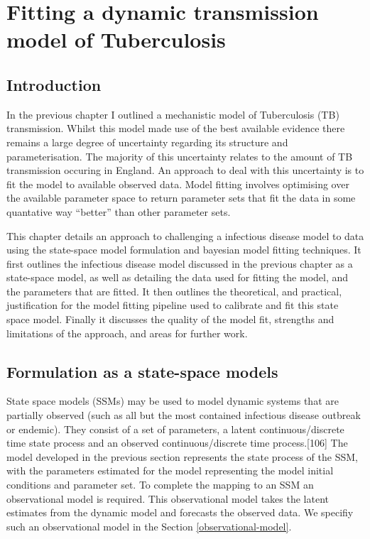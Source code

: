 \documentclass[11pt,twoside]{bristolthesis}
\begin{document}
  \hypertarget{model-fitting}{%
  \chapter{Fitting a dynamic transmission model of Tuberculosis}\label{model-fitting}}
  
  \hypertarget{introduction-7}{%
  \section{Introduction}\label{introduction-7}}
  
  In the previous chapter I outlined a mechanistic model of Tuberculosis (TB) transmission. Whilst this model made use of the best available evidence there remains a large degree of uncertainty regarding its structure and parameterisation. The majority of this uncertainty relates to the amount of TB transmission occuring in England. An approach to deal with this uncertainty is to fit the model to available observed data. Model fitting involves optimising over the available parameter space to return parameter sets that fit the data in some quantative way ``better'' than other parameter sets.
  
  This chapter details an approach to challenging a infectious disease model to data using the state-space model formulation and bayesian model fitting techniques. It first outlines the infectious disease model discussed in the previous chapter as a state-space model, as well as detailing the data used for fitting the model, and the parameters that are fitted. It then outlines the theoretical, and practical, justification for the model fitting pipeline used to calibrate and fit this state space model. Finally it discusses the quality of the model fit, strengths and limitations of the approach, and areas for further work.
  
  \hypertarget{formulation-as-a-state-space-models}{%
  \section{Formulation as a state-space models}\label{formulation-as-a-state-space-models}}
  
  State space models (SSMs) may be used to model dynamic systems that are partially observed (such as all but the most contained infectious disease outbreak or endemic). They consist of a set of parameters, a latent continuous/discrete time state process and an observed continuous/discrete time process.{[}106{]} The model developed in the previous section represents the state process of the SSM, with the parameters estimated for the model representing the model initial conditions and parameter set. To complete the mapping to an SSM an observational model is required. This observational model takes the latent estimates from the dynamic model and forecasts the observed data. We specifiy such an observational model in the Section \ref{observational-model}.
  
\end{document}
